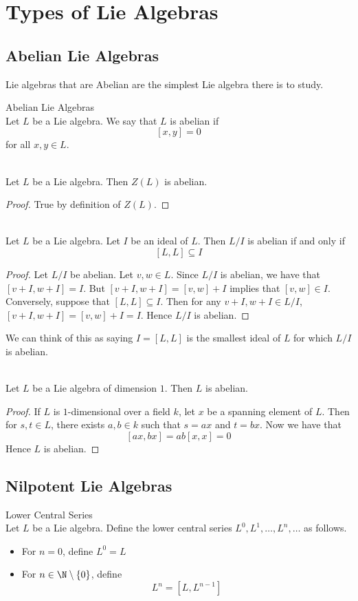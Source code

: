 \documentclass[a4paper]{article}
\begin{document}
\pagebreak
\section{Types of Lie Algebras}
\subsection{Abelian Lie Algebras}
Lie algebras that are Abelian are the simplest Lie algebra there is to study. 

\begin{defn}{Abelian Lie Algebras}{} \\Let $L$ be a Lie algebra. We say that $L$ is abelian if $$[x,y]=0$$ for all $x,y\in L$. 
\end{defn}

\begin{lmm}{}{} \\Let $L$ be a Lie algebra. Then $Z(L)$ is abelian. 
\begin{proof}
True by definition of $Z(L)$. 
\end{proof}
\end{lmm}

\begin{lmm}{}{} \\Let $L$ be a Lie algebra. Let $I$ be an ideal of $L$. Then $L/I$ is abelian if and only if $$[L,L]\subseteq I$$ 
\begin{proof}
Let $L/I$ be abelian. Let $v,w\in L$. Since $L/I$ is abelian, we have that $[v+I,w+I]=I$. But $[v+I,w+I]=[v,w]+I$ implies that $[v,w]\in I$. Conversely, suppose that $[L,L]\subseteq I$. Then for any $v+I,w+I\in L/I$, $[v+I,w+I]=[v,w]+I=I$. Hence $L/I$ is abelian. 
\end{proof}
\end{lmm}

We can think of this as saying $I=[L,L]$ is the smallest ideal of $L$ for which $L/I$ is abelian. 

\begin{prp}{}{} \\Let $L$ be a Lie algebra of dimension $1$. Then $L$ is abelian. 
\begin{proof}
If $L$ is $1$-dimensional over a field $k$, let $x$ be a spanning element of $L$. Then for $s,t\in L$, there exists $a,b\in k$ such that $s=ax$ and $t=bx$. Now we have that $$[ax,bx]=ab[x,x]=0$$ Hence $L$ is abelian. 
\end{proof}
\end{prp}

\subsection{Nilpotent Lie Algebras}
\begin{defn}{Lower Central Series}{} \\Let $L$ be a Lie algebra. Define the lower central series $L^0,L^1,\dots,L^n,\dots$ as follows. 
\begin{itemize}
\item For $n=0$, define $L^0=L$
\item For $n\in\N\setminus\{0\}$, define $$L^n=[L,L^{n-1}]$$
\end{itemize}
\end{defn}
\end{document}
